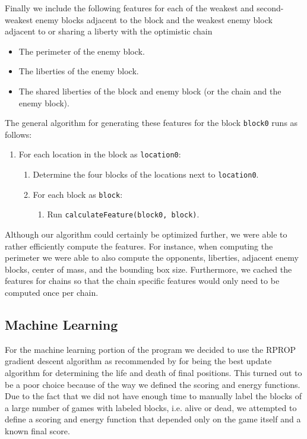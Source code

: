 \documentclass[11pt,letterpaper]{article}
\begin{document}
Finally we include the following features for each of the weakest and second-weakest enemy blocks adjacent to
the block and
the weakest enemy block adjacent to or sharing a liberty with the optimistic chain
\begin{itemize}
  \item The perimeter of the enemy block.
  \item The liberties of the enemy block.
  \item The shared liberties of the block and enemy block (or the chain and the enemy block).
\end{itemize}

The general algorithm for generating these features for the block {\tt block0} runs as follows:
\begin{enumerate}
  \item For each location in the block as {\tt location0}:
    \begin{enumerate}
      \item Determine the four blocks of the locations next to {\tt location0}.
      \item For each block as {\tt block}:
        \begin{enumerate}
          \item Run {\tt calculateFeature(block0, block)}.
        \end{enumerate}
    \end{enumerate}
\end{enumerate}

Although our algorithm could certainly be optimized further, we were able to rather efficiently compute the features.
For instance, when computing the perimeter we were able to also compute the opponents, liberties, adjacent enemy
blocks, center of mass, and the bounding box size. Furthermore, we cached the features for chains so that the
chain specific features would only need to be computed once per chain.

\subsection{Machine Learning}

For the machine learning portion of the program we decided to use the RPROP gradient descent algorithm as
recommended by \cite{WHU:04} for being the best update algorithm for determining the life and death of final
positions. This turned out to be a poor choice because of the way we defined the scoring and energy functions.
Due to the fact that we did not have enough time to manually label the blocks of a large number of games with
labeled blocks, i.e. alive or dead, we attempted to define a scoring and energy function that depended only on
the game itself and a known final score.
\end{document}
